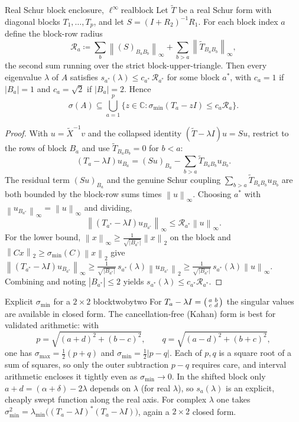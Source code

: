 \documentclass[11pt, a4paper]{article}
\numberwithin{equation}{section}
\newcommand{\norm}[1]{\left\|#1\right\|}
\newcommand{\abs}[1]{\left|#1\right|}
\newcommand{\tX}{\widetilde{X}}
\newcommand{\tT}{\widetilde{T}}
\newcommand{\C}{\mathbb{C}}
\begin{document}
\begin{theorem}{Real Schur block enclosure, $\ell^\infty$}{realblock}
  Let $\tT$ be a real Schur form with diagonal blocks $T_1, \ldots, T_p$, and
  let $S = (I+R_2)^{-1}R_1$.  For each block index $a$ define the block-row
  radius
  \[
    \mathcal{R}_a \coloneqq \sum_{b}\norm{(S)_{B_a B_b}}_\infty
      + \sum_{b>a}\norm{\tT_{B_a B_b}}_\infty,
  \]
  the second sum running over the strict block-upper-triangle.  Then every
  eigenvalue $\lambda$ of $A$ satisfies $s_{a^*}(\lambda) \le c_{a^*}\,
  \mathcal{R}_{a^*}$ for some block $a^*$, with $c_a = 1$ if $\abs{B_a}=1$ and
  $c_a = \sqrt 2$ if $\abs{B_a}=2$.  Hence
  \[
    \sigma(A) \subseteq \bigcup_{a=1}^p
      \bigl\{ z \in \C : \sigma_{\min}(T_a - z I) \le c_a \mathcal{R}_a \bigr\}.
  \]
\end{theorem}

\begin{proof}
With $u = \tX^{-1}v$ and the collapsed identity $(\tT - \lambda I)u = Su$,
restrict to the rows of block $B_a$ and use $\tT_{B_a B_b} = 0$ for $b < a$:
\[
  (T_a - \lambda I)u_{B_a}
    = (Su)_{B_a} - \sum_{b > a}\tT_{B_a B_b}u_{B_b}.
\]
The residual term $(Su)_{B_a}$ and the genuine Schur coupling $\sum_{b>a}\tT_{B_a
B_b}u_{B_b}$ are both bounded by the block-row sums times $\norm{u}_\infty$.
Choosing $a^*$ with
$\norm{u_{B_{a^*}}}_\infty = \norm{u}_\infty$ and dividing,
\[
  \norm{(T_{a^*} - \lambda I)u_{B_{a^*}}}_\infty \le \mathcal{R}_{a^*}\norm{u}_\infty.
\]
For the lower bound, $\norm{x}_\infty \ge \tfrac{1}{\sqrt{\abs{B_{a^*}}}}
\norm{x}_2$ on the block and $\norm{Cx}_2 \ge \sigma_{\min}(C)\norm{x}_2$ give
$\norm{(T_{a^*}-\lambda I)u_{B_{a^*}}}_\infty \ge
\tfrac{1}{\sqrt{\abs{B_{a^*}}}}\, s_{a^*}(\lambda)\norm{u_{B_{a^*}}}_2 \ge
\tfrac{1}{\sqrt{\abs{B_{a^*}}}}\,s_{a^*}(\lambda)\norm{u}_\infty$.  Combining and
noting $\abs{B_{a^*}}\le 2$ yields $s_{a^*}(\lambda) \le c_{a^*}\mathcal{R}_{a^*}$.
\end{proof}

\begin{remark}{Explicit $\sigma_{\min}$ for a $2\times 2$ block}{twobytwo}
  For $T_a - \lambda I = \begin{psmallmatrix} a & b \\ c & d \end{psmallmatrix}$
  the singular values are available in closed form.  The cancellation-free
  (Kahan) form is best for validated arithmetic: with
  \[
    p = \sqrt{(a+d)^2 + (b-c)^2}, \qquad q = \sqrt{(a-d)^2 + (b+c)^2},
  \]
  one has $\sigma_{\max} = \tfrac12(p+q)$ and $\sigma_{\min} =
  \tfrac12\abs{p-q}$.  Each of $p, q$ is a square root of a sum of squares, so
  only the outer subtraction $p - q$ requires care, and interval arithmetic
  encloses it tightly even as $\sigma_{\min}\to 0$.  In the shifted block only
  $a + d = (\alpha + \delta) - 2\lambda$ depends on $\lambda$ (for real
  $\lambda$), so $s_a(\lambda)$ is an explicit, cheaply swept function along the
  real axis.  For complex $\lambda$ one takes $\sigma_{\min}^2 =
  \lambda_{\min}\bigl((T_a - \lambda I)^*(T_a - \lambda I)\bigr)$, again a
  $2\times 2$ closed form.
\end{remark}
\end{document}
